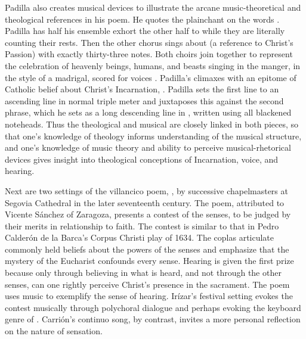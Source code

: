 Padilla also creates musical devices to illustrate the arcane music-theoretical 
and theological references in his poem.
He quotes the plainchant  on the words .
Padilla has half his ensemble exhort the other half to  while they are literally counting their rests.
Then the other chorus sings about  (a 
reference to Christ's Passion) with exactly thirty-three notes.
Both choirs join together to represent the celebration of heavenly beings, 
humans, and beasts singing in the manger, in the style of a madrigal, scored 
for voices .
Padilla's  climaxes with an epitome of Catholic belief about
Christ's Incarnation, .
Padilla sets the first line to an ascending line in normal triple meter and 
juxtaposes this against the second phrase, which he sets as a long descending 
line in , written using all blackened noteheads.
Thus the theological and musical are closely linked in both pieces, so that 
one's knowledge of theology informs understanding of the musical structure, and 
one's knowledge of music theory and ability to perceive musical-rhetorical 
devices gives insight into theological conceptions of Incarnation, voice, and
hearing.


Next are two settings of the villancico poem, , by successive chapelmasters at Segovia Cathedral in the 
later seventeenth century.%
    \Autocite[285--338]{Cashner:PhD}
The poem, attributed to Vicente Sánchez of Zaragoza, presents a contest 
of the senses, to be judged by their merits in relationship to faith.
The contest is similar to that in Pedro Calderón de la Barca's Corpus Christi 
play  of 1634.%
    \Autocites{Calderon:Retiro}[52--107]{Cashner:PhD}
The coplas articulate commonly held beliefs about the powers of the senses and 
emphasize that the mystery of the Eucharist confounds every sense.
Hearing is given the first prize because only through believing in what is 
heard, and not through the other senses, can one rightly perceive Christ's 
presence in the sacrament.
The poem uses music to exemplify the sense of hearing.
Irízar's festival setting evokes the contest musically through polychoral
dialogue and perhaps evoking the keyboard genre of .%
    \Autocite{Sutton:IberianBatalla}
Carrión's continuo song, by contrast, invites a more personal reflection on the 
nature of sensation.

